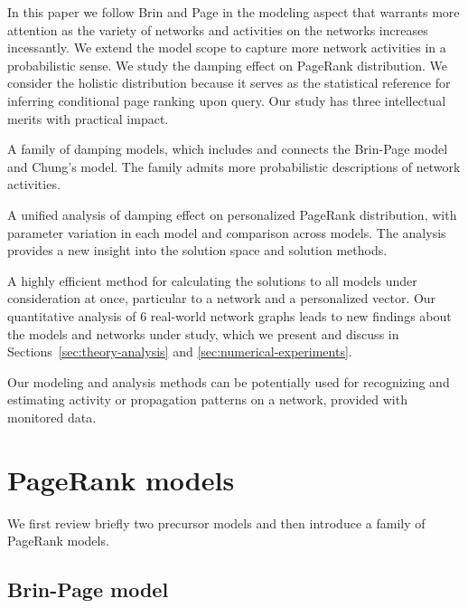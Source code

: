 \documentclass[conference]{IEEEtran}
\begin{document}
In this paper we follow Brin and Page in the modeling aspect that
warrants more attention as the variety of networks and activities on the
networks increases incessantly.  We extend the model scope to capture
more network activities in a probabilistic sense. We study the damping
effect on PageRank distribution.  We consider the holistic distribution
because it serves as the statistical reference for inferring conditional
page ranking upon query. Our study has three intellectual merits with 
practical impact.
%
\begin{inparaenum}[(1)]
\item A family of damping models, which includes and connects the
  Brin-Page model and Chung's model. The family admits more
  probabilistic descriptions of network activities. 
%
\item A unified analysis of damping effect on personalized PageRank
  distribution, with parameter variation in each model and comparison
  across models. The analysis provides a new insight into the solution
  space and solution methods.
%
\item A highly efficient method for calculating the solutions to all
  models under consideration at once, particular to a network and a
  personalized vector.  Our quantitative analysis of $6$ real-world
  network graphs leads to new findings about the models and networks under
  study, which we present and discuss in Sections~\ref{sec:theory-analysis}
  and \ref{sec:numerical-experiments}.
%
%
\end{inparaenum} 
%
Our modeling and analysis methods can be potentially used for
recognizing and estimating activity or propagation patterns on a
network, provided with monitored data.
% 
%

 
% 



\section{PageRank models}
\label{sec:pageRank-models}
%


We first review briefly two precursor models and then introduce a family
of PageRank models.


\subsection{Brin-Page model} 
\label{subsec:Brin-Page-model}
%
\end{document}
